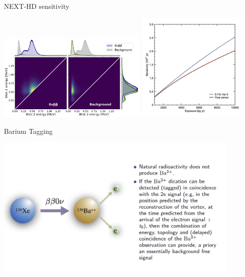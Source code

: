 \documentclass [aspectratio=169]{beamer}
\begin{document}
\begin{frame}{NEXT-HD sensitivity}

\includegraphics[width=0.55\textwidth]{BlobComparison.jpg}
\includegraphics[width=0.40\textwidth]{sensitivity_nexthd_lsc.jpg}
\end{frame}

\begin{frame}{Barium Tagging}

\includegraphics[width=0.90\textwidth]{Ba2pCartoon.png}

\end{frame}
\end{document}
